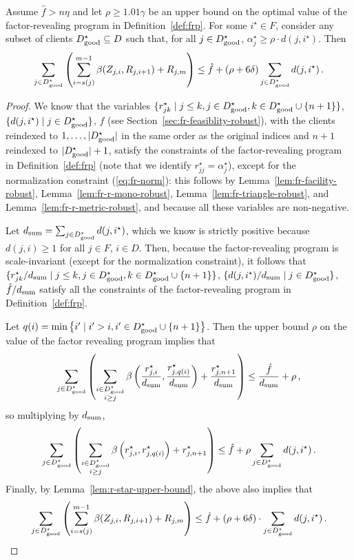 \begin{lemma}
\label{lem:dgood-cost-robust}
    Assume $\hat{f} > n \eta$ and let $\rho \geq 1.01 \gamma$ be an upper bound on the optimal value of the factor-revealing program in Definition~\ref{def:frp}.
    For some $i^\star \in F$, consider any subset of clients $D^\star_{\mathrm{good}} \subseteq D$ such that, for all $j \in D^\star_{\mathrm{good}}$, $\alpha_j^\star \geq \rho \cdot d(j, i^\star)$.
    Then
    \[\sum_{j \in D^\star_{\mathrm{good}}} \left(\sum_{i=s(j)}^{m-1} \beta(Z_{j,i}, R_{j,i+1}) + R_{j, m}\right) \leq \hat{f} + (\rho+6\delta) \sum_{j \in D^\star_{\mathrm{good}}} d(j, i^\star)\,.\]
\end{lemma}
\begin{proof}
We know that the variables $\{r^\star_{jk} \mid j \leq k, j \in D^\star_{\mathrm{good}}, k \in D^\star_{\mathrm{good}} \cup \{n + 1\}\}$, $\{d(j, i^\star) \mid j \in D^\star_{\mathrm{good}}\}$, $\hat f$ (see Section~\ref{sec:fr-feasiblity-robust}), with the clients reindexed to $1, \ldots, |D^\star_{\mathrm{good}}|$  in the same order as the original indices and $n+1$ reindexed to $|D^\star_{\mathrm{good}}|+1$, satisfy the constraints of the factor-revealing program in Definition~\ref{def:frp} (note that we identify $r^\star_{jj} = \alpha^\star_j$), except for the normalization constraint (\ref{eq:fr-norm}): this follows by Lemma~\ref{lem:fr-facility-robust}, Lemma~\ref{lem:fr-r-mono-robust}, Lemma~\ref{lem:fr-triangle-robust}, and Lemma~\ref{lem:fr-r-metric-robust}, and because all these variables are non-negative.

Let $d_{\mathrm{sum}} = \sum_{j \in D^\star_{\mathrm{good}}} d(j, i^\star)$, which we know is strictly positive because $d(j, i) \geq 1$ for all $j \in F$, $i \in D$.
Then, because the factor-revealing program is scale-invariant (except for the normalization constraint), it follows that $\{r^\star_{jk} / d_{\mathrm{sum}} \mid j \leq k, j \in D^\star_{\mathrm{good}}, k \in D^\star_{\mathrm{good}} \cup \{n + 1\}\}$, $\{d(j, i^\star) / d_{\mathrm{sum}} \mid j \in D^\star_{\mathrm{good}}\}$, $\hat f / d_{\mathrm{sum}}$ satisfy all the constraints of the factor-revealing program in Definition~\ref{def:frp}.

Let $q(i) = \min \left\{i' \mid i' > i, i' \in D^\star_{\mathrm{good}} \cup \{n+1\}\right\}$.
Then the upper bound $\rho$ on the value of the factor revealing program implies that
\[\sum_{j \in D^\star_{\mathrm{good}}} \left(\sum_{\substack{i \in D^\star_{\mathrm{good}}\\i \geq j}} \beta\left(\frac{r^\star_{j,i}}{d_{\mathrm{sum}}}, \frac{r^\star_{j,q(i)}}{d_{\mathrm{sum}}}\right) + \frac{r^\star_{j,n+1}}{d_{\mathrm{sum}}} \right) \leq \frac{\hat{f}}{d_{\mathrm{sum}}} + \rho\,,\]
so multiplying by $d_{\mathrm{sum}}$, 
\[\sum_{j \in D^\star_{\mathrm{good}}} \left(\sum_{\substack{i \in D^\star_{\mathrm{good}}\\i \geq j}} \beta\left(r^\star_{j,i}, r^\star_{j,q(i)}\right) + r^\star_{j,n+1}\right) \leq \hat{f} + \rho \sum_{j \in D^\star_{\mathrm{good}}} d(j, i^\star)\,.\]
Finally, by Lemma~\ref{lem:r-star-upper-bound}, the above also implies that
\[\sum_{j \in D^\star_{\mathrm{good}}} \left(\sum_{i=s(j)}^{m-1} \beta(Z_{j,i}, R_{j,i+1}) + R_{j, m}\right)  \leq \hat{f} + (\rho + 6 \delta) \cdot \sum_{j \in D^\star_{\mathrm{good}}} d(j, i^\star)\,.\]
\end{proof}

